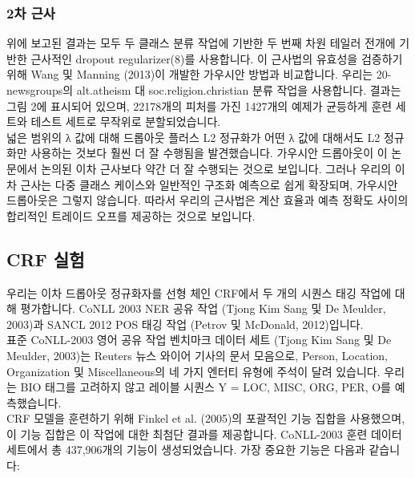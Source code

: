 \documentclass{article}
\begin{document}
\subsubsection{2차 근사}
위에 보고된 결과는 모두 두 클래스 분류 작업에 기반한 두 번째 차원 테일러 전개에 기반한 근사적인 dropout regularizer(8)를 사용합니다. 이 근사법의 유효성을 검증하기 위해 Wang 및 Manning (2013)이 개발한 가우시안 방법과 비교합니다. 우리는 20-newsgroups의 alt.atheism 대 soc.religion.christian 분류 작업을 사용합니다. 결과는 그림 2에 표시되어 있으며, 22178개의 피처를 가진 1427개의 예제가 균등하게 훈련 세트와 테스트 세트로 무작위로 분할되었습니다.\\

넓은 범위의 λ 값에 대해 드롭아웃 플러스 L2 정규화가 어떤 λ 값에 대해서도 L2 정규화만 사용하는 것보다 훨씬 더 잘 수행됨을 발견했습니다. 가우시안 드롭아웃이 이 논문에서 논의된 이차 근사보다 약간 더 잘 수행되는 것으로 보입니다. 그러나 우리의 이차 근사는 다중 클래스 케이스와 일반적인 구조화 예측으로 쉽게 확장되며, 가우시안 드롭아웃은 그렇지 않습니다. 따라서 우리의 근사법은 계산 효율과 예측 정확도 사이의 합리적인 트레이드 오프를 제공하는 것으로 보입니다.

\subsection{CRF 실험}
우리는 이차 드롭아웃 정규화자를 선형 체인 CRF에서 두 개의 시퀀스 태깅 작업에 대해 평가합니다. CoNLL 2003 NER 공유 작업 (Tjong Kim Sang 및 De Meulder, 2003)과 SANCL 2012 POS 태깅 작업 (Petrov 및 McDonald, 2012)입니다.\\

표준 CoNLL-2003 영어 공유 작업 벤치마크 데이터 세트 (Tjong Kim Sang 및 De Meulder, 2003)는 Reuters 뉴스 와이어 기사의 문서 모음으로, Person, Location, Organization 및 Miscellaneous의 네 가지 엔터티 유형에 주석이 달려 있습니다. 우리는 BIO 태그를 고려하지 않고 레이블 시퀀스 Y = {LOC, MISC, ORG, PER, O}를 예측했습니다.\\

CRF 모델을 훈련하기 위해 Finkel et al. (2005)의 포괄적인 기능 집합을 사용했으며, 이 기능 집합은 이 작업에 대한 최첨단 결과를 제공합니다. CoNLL-2003 훈련 데이터 세트에서 총 437,906개의 기능이 생성되었습니다. 가장 중요한 기능은 다음과 같습니다:
\end{document}
